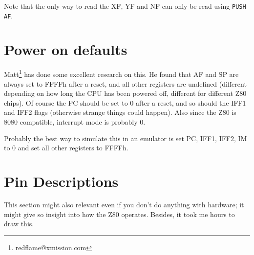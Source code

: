 \documentclass[oneside,a4paper]{book}
\begin{document}
Note that the only way to read the XF, YF and NF can only be read using
{\tt PUSH AF}.


\section{Power on defaults}
\label{pon}

Matt\footnote{redflame@xmission.com} has done some excellent research on this. He found that AF and SP are always set to FFFFh after a reset, and all other registers are undefined (different depending on how long the CPU has been powered off, different for different Z80 chips). Of course the PC should be set to 0 after a reset, and so should the IFF1 and IFF2 flags (otherwise strange things could happen). Also since the Z80 is 8080 compatible, interrupt mode is probably 0.

Probably the best way to simulate this in an emulator is set PC, IFF1, IFF2, IM to 0 and set all other registers to FFFFh.


\section{Pin Descriptions \cite{datasheet}}

This section might also relevant even if you don't do anything with hardware; it might give so insight into how the Z80 operates. Besides, it took me hours to draw this.
\end{document}
